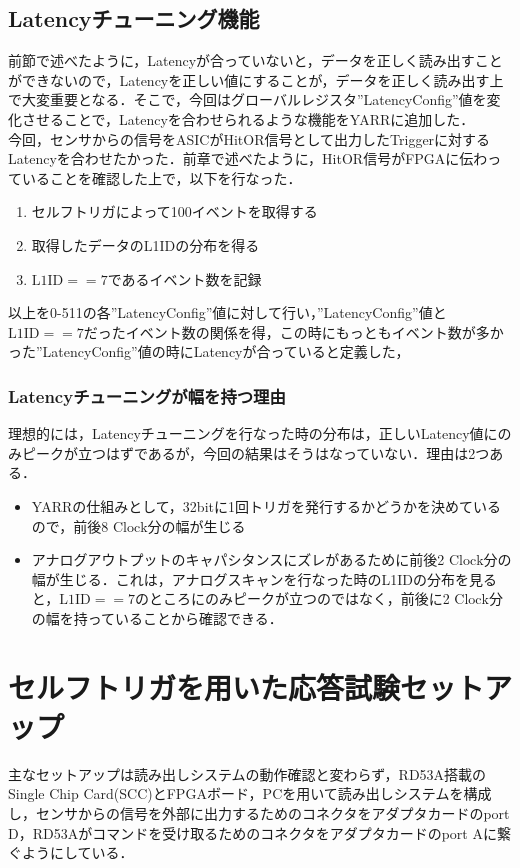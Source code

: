 \subsection{Latencyチューニング機能}
前節で述べたように，Latencyが合っていないと，データを正しく読み出すことができないので，Latencyを正しい値にすることが，データを正しく読み出す上で大変重要となる．そこで，今回はグローバルレジスタ''LatencyConfig''値を変化させることで，Latencyを合わせられるような機能をYARRに追加した．\\
今回，センサからの信号をASICがHitOR信号として出力したTriggerに対するLatencyを合わせたかった．前章で述べたように，HitOR信号がFPGAに伝わっていることを確認した上で，以下を行なった．
\begin{enumerate}
\item セルフトリガによって100イベントを取得する
\item 取得したデータのL1IDの分布を得る
\item $\mathrm{L1ID} == 7$であるイベント数を記録
\end{enumerate}
以上を0-511の各''LatencyConfig''値に対して行い，''LatencyConfig''値と$\mathrm{L1ID} == 7$だったイベント数の関係を得，この時にもっともイベント数が多かった''LatencyConfig''値の時にLatencyが合っていると定義した，

\subsubsection{Latencyチューニングが幅を持つ理由}
理想的には，Latencyチューニングを行なった時の分布は，正しいLatency値にのみピークが立つはずであるが，今回の結果はそうはなっていない．理由は2つある．
\begin{itemize}
\item YARRの仕組みとして，32bitに1回トリガを発行するかどうかを決めているので，前後8 $\mathrm{Clock}$分の幅が生じる
\item アナログアウトプットのキャパシタンスにズレがあるために前後2 $\mathrm{Clock}$分の幅が生じる．これは，アナログスキャンを行なった時のL1IDの分布を見ると，$\mathrm{L1ID} == 7$のところにのみピークが立つのではなく，前後に2 $\mathrm{Clock}$分の幅を持っていることから確認できる．
\end{itemize}

\section{セルフトリガを用いた応答試験セットアップ}
主なセットアップは読み出しシステムの動作確認と変わらず，RD53A搭載のSingle Chip Card(SCC)とFPGAボード，PCを用いて読み出しシステムを構成し，センサからの信号を外部に出力するためのコネクタをアダプタカードのport D，RD53Aがコマンドを受け取るためのコネクタをアダプタカードのport Aに繋ぐようにしている．



